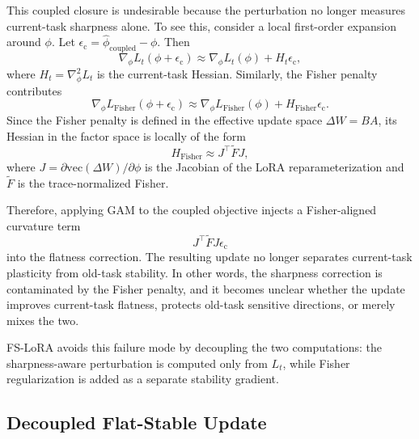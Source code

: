 This coupled closure is undesirable because the perturbation no longer measures current-task sharpness alone.
To see this, consider a local first-order expansion around $\phi$.
Let $\epsilon_{\mathrm{c}}=\hat{\phi}_{\mathrm{coupled}}-\phi$.
Then
\begin{equation}
\nabla_{\phi} L_t(\phi+\epsilon_{\mathrm{c}})
\approx
\nabla_{\phi} L_t(\phi)
+
H_t \epsilon_{\mathrm{c}},
\label{eq:task_expansion}
\end{equation}
where $H_t=\nabla^2_{\phi}L_t$ is the current-task Hessian.
Similarly, the Fisher penalty contributes
\begin{equation}
\nabla_{\phi} L_{\mathrm{Fisher}}(\phi+\epsilon_{\mathrm{c}})
\approx
\nabla_{\phi} L_{\mathrm{Fisher}}(\phi)
+
H_{\mathrm{Fisher}}\epsilon_{\mathrm{c}}.
\label{eq:fisher_expansion}
\end{equation}
Since the Fisher penalty is defined in the effective update space $\Delta W=BA$, its Hessian in the factor space is locally of the form
\begin{equation}
H_{\mathrm{Fisher}}
\approx
J^\top
\widetilde F
J,
\label{eq:fisher_hessian}
\end{equation}
where $J=\partial \mathrm{vec}(\Delta W)/\partial\phi$ is the Jacobian of the LoRA reparameterization and $\widetilde F$ is the trace-normalized Fisher.

Therefore, applying GAM to the coupled objective injects a Fisher-aligned curvature term
\begin{equation}
J^\top
\widetilde F
J
\epsilon_{\mathrm{c}}
\label{eq:fisher_cross_term}
\end{equation}
into the flatness correction.
The resulting update no longer separates current-task plasticity from old-task stability.
In other words, the sharpness correction is contaminated by the Fisher penalty, and it becomes unclear whether the update improves current-task flatness, protects old-task sensitive directions, or merely mixes the two.

FS-LoRA avoids this failure mode by decoupling the two computations: the sharpness-aware perturbation is computed only from $L_t$, while Fisher regularization is added as a separate stability gradient.

\subsection{Decoupled Flat-Stable Update}
\label{sec:decoupled_update}

